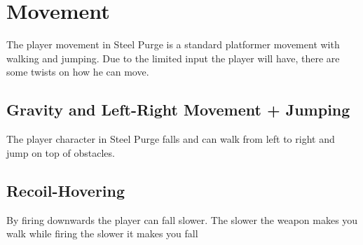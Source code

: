 \documentclass[../Main.tex]{subfiles}
\begin{document}
\section{Movement}

The player movement in Steel Purge is a standard platformer movement with walking and jumping. Due to the limited input the player will have, there are some twists on how he can move.

\subsection{Gravity and Left-Right Movement + Jumping}

The player character in Steel Purge falls and can walk from left to right and jump on top of obstacles.

\subsection{Recoil-Hovering}

By firing downwards the player can fall slower. The slower the weapon makes you walk while firing the slower it makes you fall
\end{document}
